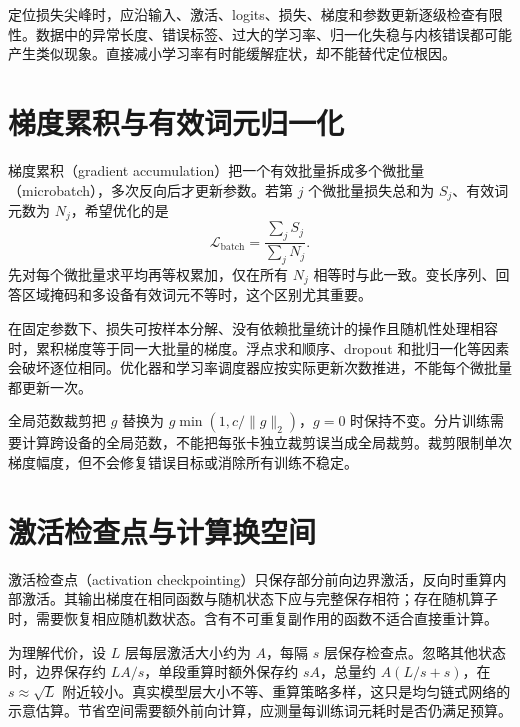 定位损失尖峰时，应沿输入、激活、logits、损失、梯度和参数更新逐级检查有限性。数据中的异常长度、错误标签、过大的学习率、归一化失稳与内核错误都可能产生类似现象。直接减小学习率有时能缓解症状，却不能替代定位根因。

\section{梯度累积与有效词元归一化}

梯度累积（gradient accumulation）把一个有效批量拆成多个微批量（microbatch），多次反向后才更新参数。若第 $j$ 个微批量损失总和为 $S_j$、有效词元数为 $N_j$，希望优化的是
\begin{equation}
\mathcal L_{\mathrm{batch}}=\frac{\sum_jS_j}{\sum_jN_j}.
\label{eq:token-normalization}
\end{equation}
先对每个微批量求平均再等权累加，仅在所有 $N_j$ 相等时与此一致。变长序列、回答区域掩码和多设备有效词元不等时，这个区别尤其重要。

在固定参数下、损失可按样本分解、没有依赖批量统计的操作且随机性处理相容时，累积梯度等于同一大批量的梯度。浮点求和顺序、dropout 和批归一化等因素会破坏逐位相同。优化器和学习率调度器应按实际更新次数推进，不能每个微批量都更新一次。

全局范数裁剪把 $g$ 替换为 $g\min(1,c/\|g\|_2)$，$g=0$ 时保持不变。分片训练需要计算跨设备的全局范数，不能把每张卡独立裁剪误当成全局裁剪。裁剪限制单次梯度幅度，但不会修复错误目标或消除所有训练不稳定。

\section{激活检查点与计算换空间}

激活检查点（activation checkpointing）只保存部分前向边界激活，反向时重算内部激活。其输出梯度在相同函数与随机状态下应与完整保存相符；存在随机算子时，需要恢复相应随机数状态。含有不可重复副作用的函数不适合直接重计算。

为理解代价，设 $L$ 层每层激活大小约为 $A$，每隔 $s$ 层保存检查点。忽略其他状态时，边界保存约 $LA/s$，单段重算时额外保存约 $sA$，总量约 $A(L/s+s)$，在 $s\approx\sqrt L$ 附近较小。真实模型层大小不等、重算策略多样，这只是均匀链式网络的示意估算。节省空间需要额外前向计算，应测量每训练词元耗时是否仍满足预算。

